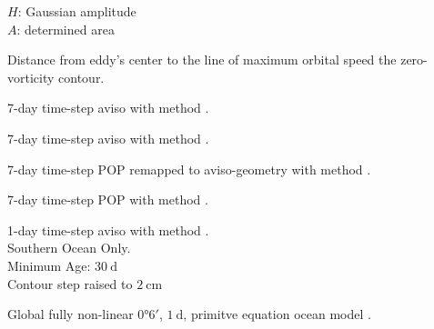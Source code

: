 \begin{fullwidth}
\begin{multicols}{2}
\begin{definition}
$H$: Gaussian amplitude\\
$A$: determined area\\
 \end{definition}
\begin{definition}\label{def:scale}
Distance from eddy's center to the line of maximum orbital speed \ie the zero-vorticity contour.
\end{definition}
\begin{definition}\label{def:aviI}
7-day time-step aviso with method \MI.
\end{definition}
\begin{definition}\label{def:aviII}
7-day time-step aviso with method \MII.
\end{definition}
\begin{definition}\label{def:p2aII}
7-day time-step POP remapped to aviso-geometry with method \MII.
\end{definition}
\begin{definition}\label{def:pop7II}
7-day time-step POP with method \MII.
\end{definition}
\begin{definition}\label{def:pop1IISO}
1-day time-step aviso with method \MII. \\Southern Ocean Only. \\Minimum Age: $\SI{30}{\day}$ \\ Contour step raised to $\SI{2}{\cm}$
\end{definition}
\begin{definition}\label{def:POP}
Global fully non-linear $\ang{0;6;}$, $\SI{1}{\day}$, primitve equation ocean model \citet{Oestreicher}.
\end{definition}
\begin{definition}\label{def:AVISO}
\citet{Forget2010}
\end{definition}


\end{multicols}
\end{fullwidth}

